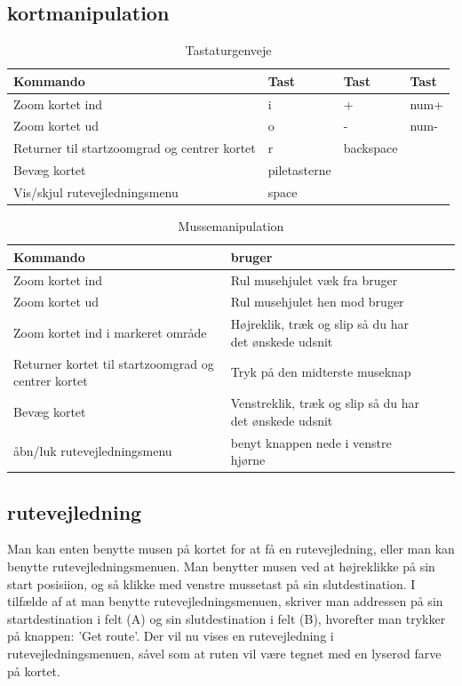 \subsection{kortmanipulation}
\begin{table}[h!t]
\centering
	\caption{Tastaturgenveje}
	\begin{tabular}{p{6cm} l l l}
		\hline\hline
		Kommando & Tast & Tast & Tast \\ [0.5ex]
		\hline
		Zoom kortet ind & i & + & num+\\
		Zoom kortet ud & o & - & num-\\
		Returner til startzoomgrad og centrer kortet & r & backspace\\
		Bevæg kortet & piletasterne\\
		Vis/skjul rutevejledningsmenu & space \\
		\hline
	\end{tabular}
\end{table}

\begin{table}[h!t]
\centering
	\caption{Mussemanipulation}
	\begin{tabular}{p{6cm} l l p{4cm}}
		\hline\hline
		Kommando & bruger \\ [0.5ex]
		\hline
		Zoom kortet ind & Rul musehjulet væk fra bruger\\
		Zoom kortet ud & Rul musehjulet hen mod bruger\\
		Zoom kortet ind i markeret område & Højreklik, træk og slip så du har det ønskede udsnit\\
		Returner kortet til startzoomgrad og centrer kortet & Tryk på den midterste museknap\\
		Bevæg kortet & Venstreklik, træk og slip så du har det ønskede udsnit\\
		åbn/luk rutevejledningsmenu & benyt knappen nede i venstre hjørne\\
		\hline
	\end{tabular}
\end{table}

\subsection{rutevejledning}

Man kan enten  benytte musen på kortet for at få en rutevejledning, eller man kan benytte rutevejledningsmenuen. Man benytter musen ved at højreklikke på sin start posisiion, og så klikke med venstre mussetast på sin slutdestination. I tilfælde af at man benytte rutevejledningsmenuen, skriver man addressen på sin startdestination i felt (A) og sin slutdestination i felt (B), hvorefter man trykker på knappen: 'Get route'. Der vil nu vises en rutevejledning i rutevejledningsmenuen, såvel som at ruten vil være tegnet med en lyserød farve på kortet.

